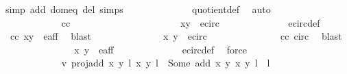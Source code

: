 \begin{isabellebody}
{\isacharparenleft}simp\ add{\isacharcolon}\ dom{\isacharunderscore}eq\ del{\isacharcolon}\ {\isasymtau}{\isachardot}simps{\isacharparenright}\isanewline
\ \ \ \ \ \ \ \ \ \ \ \ \isamarkupfalse%
\ quotient{\isacharunderscore}def\ \isamarkupfalse%
\ auto\isanewline
\ \ \ \ \ \ \ \ \isamarkupfalse%
\isanewline
\ \ \ \ \ \ \ \ \ \ \isamarkupfalse%
\ cc\isanewline
\ \ \ \ \ \ \ \ \ \ \isanewline
\ \ \ \ \ \ \ \ \ \ \isamarkupfalse%
\ {\isachardoublequoteopen}{\isacharparenleft}x{\isacharprime}{\isacharcomma}y{\isacharprime}{\isacharparenright}\ {\isasymin}\ e{\isacharunderscore}circ{\isachardoublequoteclose}\isanewline
\ \ \ \ \ \ \ \ \ \ \ \ \isamarkupfalse%
\ e{\isacharunderscore}circ{\isacharunderscore}def\ \isamarkupfalse%
\ cc\ {\isacartoucheopen}{\isacharparenleft}x{\isacharprime}{\isacharcomma}y{\isacharprime}{\isacharparenright}\ {\isasymin}\ e{\isacharunderscore}aff{\isacartoucheclose}\ \isamarkupfalse%
\ blast\isanewline
\ \ \ \ \ \ \ \ \ \ \isamarkupfalse%
\ \isamarkupfalse%
\ {\isachardoublequoteopen}{\isasymtau}\ {\isacharparenleft}x{\isacharprime}{\isacharcomma}\ y{\isacharprime}{\isacharparenright}\ {\isasymin}\ e{\isacharunderscore}circ{\isachardoublequoteclose}\ \isanewline
\ \ \ \ \ \ \ \ \ \ \ \ \isamarkupfalse%
\ cc\ {\isasymtau}{\isacharunderscore}circ\ \isamarkupfalse%
\ blast\isanewline
\ \ \ \ \ \ \ \ \ \ \isamarkupfalse%
\ \isamarkupfalse%
\ {\isachardoublequoteopen}{\isasymtau}\ {\isacharparenleft}x{\isacharprime}{\isacharcomma}\ y{\isacharprime}{\isacharparenright}\ {\isasymin}\ e{\isacharunderscore}aff{\isachardoublequoteclose}\isanewline
\ \ \ \ \ \ \ \ \ \ \ \ \isamarkupfalse%
\ e{\isacharunderscore}circ{\isacharunderscore}def\ \isamarkupfalse%
\ force\isanewline
\ \ \ \ \ \ \ \ \ \ \ \ \isanewline
\ \ \ \ \ \ \ \ \ \ \isamarkupfalse%
\ v{}{\isacharcolon}\ {\isachardoublequoteopen}proj{\isacharunderscore}add\ {\isacharparenleft}{\isacharparenleft}x{\isacharcomma}\ y{\isacharparenright}{\isacharcomma}\ l{\isacharparenright}\ {\isacharparenleft}{\isacharparenleft}x{\isacharprime}{\isacharcomma}\ y{\isacharprime}{\isacharparenright}{\isacharcomma}\ l{\isacharprime}{\isacharparenright}\ {\isacharequal}\ Some\ {\isacharparenleft}add\ {\isacharparenleft}x{\isacharcomma}\ y{\isacharparenright}\ {\isacharparenleft}x{\isacharprime}{\isacharcomma}\ y{\isacharprime}{\isacharparenright}{\isacharcomma}\ l\ {\isacharplus}\ l{\isacharprime}{\isacharparenright}{\isachardoublequoteclose}\isanewline

\end{isabellebody}
